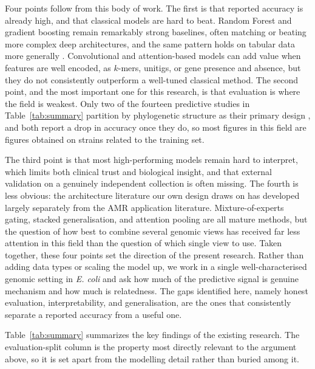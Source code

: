 \documentclass[journal]{IEEEtran}
\begin{document}
Four points follow from this body of work. The first is that reported accuracy is
already high, and that classical models are hard to beat. Random Forest and
gradient boosting remain remarkably strong baselines, often matching or beating
more complex deep architectures, and the same pattern holds on tabular data more
generally \cite{grinsztajn2022trees,shwartzziv2022tabular}. Convolutional
and attention-based models can add value when features are well encoded, as
$k$-mers, unitigs, or gene presence and absence, but they do not consistently
outperform a well-tuned classical method. The second point, and the most important
one for this research, is that evaluation is where the field is weakest. Only two
of the fourteen predictive studies in Table~\ref{tab:summary} partition by
phylogenetic structure as their primary design \cite{Yu2025,Hu2024}, and
both report a drop in accuracy once they do, so most figures in this field are
figures obtained on strains related to the training set.

The third point is that most high-performing models remain hard to interpret, which
limits both clinical trust and biological insight, and that external validation on
a genuinely independent collection is often missing. The fourth is less obvious:
the architecture literature our own design draws on has developed largely
separately from the AMR application literature. Mixture-of-experts gating, stacked
generalisation, and attention pooling are all mature methods, but the question of
how best to combine several genomic views has received far less attention in this
field than the question of which single view to use. Taken together, these four
points set the direction of the present research. Rather than adding data types or
scaling the model up, we work in a single well-characterised genomic setting in
\textit{E. coli} and ask how much of the predictive signal is genuine mechanism and
how much is relatedness. The gaps identified here, namely honest evaluation,
interpretability, and generalisation, are the ones that consistently separate a
reported accuracy from a useful one.

Table~\ref{tab:summary} summarizes the key findings of the existing research. The
evaluation-split column is the property most directly relevant to the argument
above, so it is set apart from the modelling detail rather than buried among it.
\end{document}
